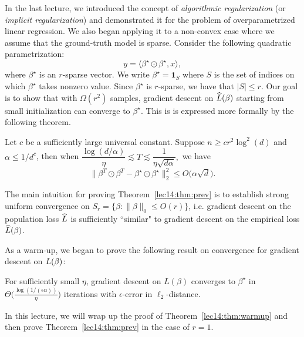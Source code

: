 \setcounter{section}{0}



In the last lecture, we introduced the concept of \textit{algorithmic regularization} (or \textit{implicit regularization}) and demonstrated it for the problem of overparametrized linear regression. We also began applying it to a non-convex case where we assume that the ground-truth model is sparse. Consider the following quadratic parametrization:
\begin{equation}
    y = \langle \beta^\star \odot \beta^\star , x\rangle,
\end{equation} 
where $\beta^\star$ is an $r$-sparse vector. We write $\beta^\star = \mathbf{1}_{S}$ where $S$ is the set of indices on which $\beta^\star$ takes nonzero value. Since $\beta^\star$ is $r$-sparse, we have that $|S| \leq r.$ Our goal is to show that with $\Omega(r^{2})$ samples, gradient descent on $\widehat{L}(\beta)$ starting from small initialization can converge to $\beta^\star$. This is is expressed more formally by the following theorem.

\begin{theorem}\label{lec14:thm:prev}
Let $c$ be a sufficiently large universal constant. Suppose $n\ge cr^2\log^2(d)$ and $\alpha\le 1 / d^c$, then when $\dfrac{\log(d/\alpha)}{\eta}\lesssim T\lesssim \dfrac{1}{\eta\sqrt{d\alpha}},$ we have
\begin{equation}\label{lec14:eqn:prev}
    \big\|\beta^T\odot\beta^T-\beta^\star\odot\beta^\star \big\|_2^2\le O \big( \alpha\sqrt{d}\big).
\end{equation}
\end{theorem}

The main intuition for proving Theorem~\ref{lec14:thm:prev} is to establish strong uniform convergence on $S_r = \{\beta : \|\beta\|_0 \leq O(r)\}$, i.e. gradient descent on the population loss $\widehat{L}$ is sufficiently ``similar" to gradient descent on the empirical loss $\widehat{L}(\beta)$.

As a warm-up, we began to prove the following result on convergence for gradient descent on $L(\beta)$:
\begin{theorem}\label{lec14:thm:warmup}
    For sufficiently small $\eta$, gradient descent on $L(\beta)$ converges to $\beta^\star$ in $\Theta\Big(\frac{\log (1/ (\epsilon\alpha) )}{\eta}\Big)$ iterations with $\epsilon$-error in $\ell_2$-distance.
\end{theorem}
In this lecture, we will wrap up the proof of Theorem~\ref{lec14:thm:warmup} and then prove Theorem~\ref{lec14:thm:prev} in the case of $r = 1$.

